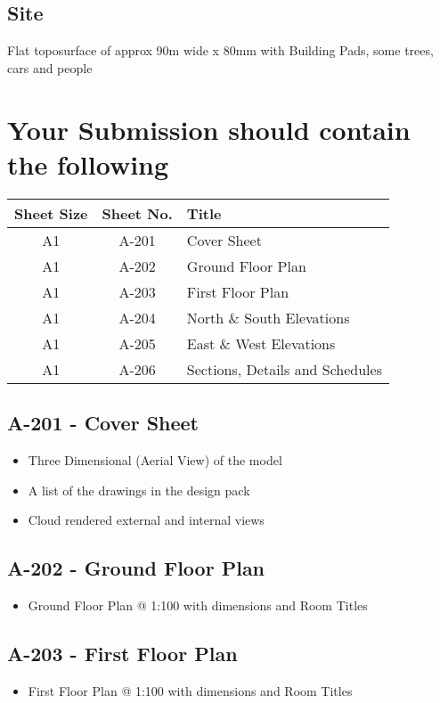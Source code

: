 \subsection*{Site}
Flat toposurface of approx 90m wide x 80mm with Building Pads, some trees, cars and people




\newpage
\section*{Your Submission should contain the following}


\begin{tabularx}{\textwidth}{ |c|c|X| }
	\hline
	\textbf{Sheet Size} & \textbf{Sheet No.} & \textbf{Title} \\
	\hline 
	A1  & A-201 & Cover Sheet \\
	A1  & A-202 & Ground Floor Plan \\
	A1  & A-203 & First Floor Plan \\
	A1  & A-204 & North \& South Elevations \\
	A1  & A-205 & East \& West Elevations \\
	A1  & A-206 & Sections, Details and Schedules \\
	\hline
\end{tabularx}


\subsection*{A-201 - Cover Sheet}
\begin{itemize}
	\item Three Dimensional (Aerial View) of the model
	\item A list of the drawings in the design pack
	\item Cloud rendered external and internal views
\end{itemize}


\subsection*{A-202 - Ground Floor Plan}
\begin{itemize}
	\item Ground Floor Plan @ 1:100 with dimensions and Room Titles
\end{itemize}


\subsection*{A-203 - First Floor Plan}
\begin{itemize}
	\item First Floor Plan @ 1:100 with dimensions and Room Titles
\end{itemize}



